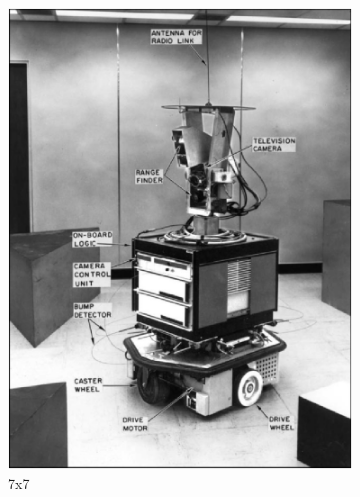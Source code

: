 \documentclass[lettersize,journal]{IEEEtran}
\begin{document}
\begin{figure}[h]
\begin{subfigure}[h]{0.115\textwidth}
        \includegraphics[width=\linewidth]{gaussian_map_7x7_sigma_1}
        \caption{7x7}  
    \end{subfigure}
    \begin{subfigure}[h]{0.115\textwidth}
        \centering

\end{subfigure}
\end{figure}
\end{document}
